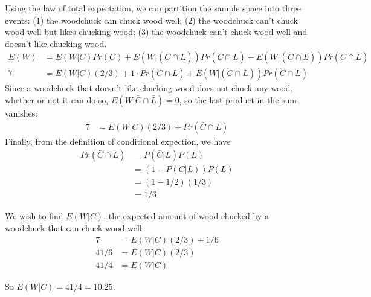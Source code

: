 \documentclass[12pt,oneside]{article}
\begin{document}
\begin{problem}{25}
{Using the law of total expectation, we can partition the sample space into three events: (1) the woodchuck can chuck wood well; (2) the woodchuck can't chuck wood well but likes chucking wood; (3) the woodchuck can't chuck wood well and doesn't like chucking wood.
\begin{align*}
 E(W) &= E(W|C)Pr(C) + E(W|(\bar C\cap L))Pr(\bar C\cap L) + E(W|(\bar C\cap\bar L))Pr(\bar C\cap\bar L) \\
 7 &= E(W|C)(2/3) + 1\cdot Pr(\bar C\cap L) + E(W|(\bar C\cap\bar L))Pr(\bar C\cap\bar L) 
\end{align*}
Since a woodchuck that doesn't like chucking wood does not chuck any wood, whether or not it can do so, $E(W|\bar C\cap\bar L) = 0$, so the last product in the sum vanishes:
\begin{align*}
 7 &= E(W|C)(2/3) + Pr(\bar C\cap L) 
\end{align*}
Finally, from the definition of conditional expection, we have
\begin{align*}
Pr(\bar C\cap L) &= P(\bar C|L)P(L) \\
 &= (1-P(C|L))P(L) \\
 &= (1-1/2)(1/3) \\
 &= 1/6
\end{align*}

We wish to find $E(W|C)$, the expected amount of wood chucked by a woodchuck that can chuck wood well:
\begin{align*}
 7 &= E(W|C)(2/3) + 1/6 \\
 41/6 &= E(W|C)(2/3) \\
 41/4 &= E(W|C)
\end{align*}

So $E(W|C) = 41/4 = 10.25$.

}

\eparts
\end{problem}



\newcommand{\kstar}{\ding{73}}
\end{document}
